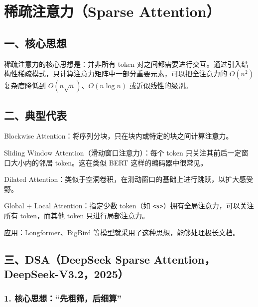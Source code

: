 \setcounter{section}{6}

\hypertarget{ux7a00ux758fux6ce8ux610fux529bsparse-attention}{%
\section{稀疏注意力（Sparse Attention）}\label{ux7a00ux758fux6ce8ux610fux529bsparse-attention}}

\hypertarget{ux4e00ux6838ux5fc3ux601dux60f3-8}{%
\subsection{一、核心思想}\label{ux4e00ux6838ux5fc3ux601dux60f3-8}}

稀疏注意力的核心思想是：并非所有 token 对之间都需要进行交互。通过引入结构性稀疏模式，只计算注意力矩阵中一部分重要元素，可以把全注意力的 \(O(n^2)\) 复杂度降低到 \(O(n\sqrt{n})\)、\(O(n\log n)\) 或近似线性的级别。

\hypertarget{ux4e8cux5178ux578bux4ee3ux8868}{%
\subsection{二、典型代表}\label{ux4e8cux5178ux578bux4ee3ux8868}}

Blockwise Attention：将序列分块，只在块内或特定的块之间计算注意力。

Sliding Window Attention（滑动窗口注意力）：每个 token 只关注其前后一定窗口大小内的邻居 token。这在类似 BERT 这样的编码器中很常见。

Dilated Attention：类似于空洞卷积，在滑动窗口的基础上进行跳跃，以扩大感受野。

Global + Local Attention：指定少数 token（如 \texttt{\textless{}s\textgreater{}}）拥有全局注意力，可以关注所有 token，而其他 token 只进行局部注意力。

应用：Longformer、BigBird 等模型就采用了这种思想，能够处理极长文档。

\hypertarget{ux4e09dsadeepseek-sparse-attentiondeepseek-v3.22025}{%
\subsection{三、DSA（DeepSeek Sparse Attention，DeepSeek-V3.2，2025）}\label{ux4e09dsadeepseek-sparse-attentiondeepseek-v3.22025}}

\hypertarget{ux6838ux5fc3ux601dux60f3ux5148ux7c97ux7b5bux540eux7ec6ux7b97}{%
\subsubsection{1. 核心思想：``先粗筛，后细算''}\label{ux6838ux5fc3ux601dux60f3ux5148ux7c97ux7b5bux540eux7ec6ux7b97}}

